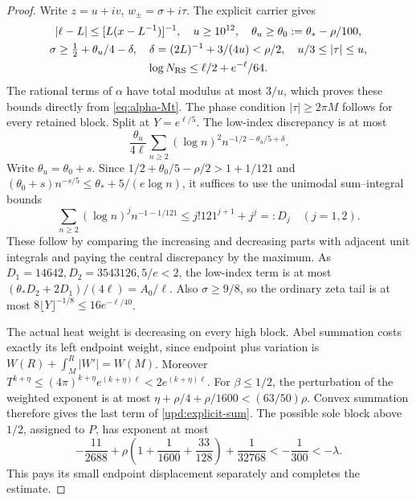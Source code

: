 \documentclass[11pt]{article}
\numberwithin{equation}{section}
\theoremstyle{definition}
\theoremstyle{remark}
\begin{document}
\begin{proof}
Write $z=u+iv$, $w_\pm=\sigma+i\tau$. The explicit carrier gives
\begin{gather*}
 |\ell-L|\le[L(x-L^{-1})]^{-1},\quad u\ge10^{12},
 \quad\theta_u\ge\theta_0:=\theta_*-\rho/100,\\
 \sigma\ge\tfrac12+\theta_u/4-\delta,
 \quad\delta=(2L)^{-1}+3/(4u)<\rho/2,\quad
 u/3\le|\tau|\le u,\\
 \log N_{\rm RS}\le\ell/2+e^{-\ell}/64.
\end{gather*}
The rational terms of $\alpha$ have total modulus at most $3/u$,
which proves these bounds directly from \eqref{eq:alpha-Mt}.
The phase condition $|\tau|\ge2\pi M$ follows for every retained
block. Split at $Y=e^{\ell/5}$. The low-index discrepancy is at most
\[
 \frac{\theta_u}{4\ell}\sum_{n\ge2}(\log n)^2
                             n^{-1/2-\theta_u/5+\delta}.
\]
Write $\theta_u=\theta_0+s$. Since
$1/2+\theta_0/5-\rho/2>1+1/121$ and
$(\theta_0+s)n^{-s/5}\le\theta_*+5/(e\log n)$, it suffices to use
the unimodal sum--integral bounds
\[
 \sum_{n\ge2}(\log n)^j n^{-1-1/121}
      \le j!121^{j+1}+j^j=:D_j\quad(j=1,2).
\]
These follow by comparing the increasing and decreasing parts with
adjacent unit integrals and paying the central discrepancy by the
maximum.  As $D_1=14642,D_2=3543126,5/e<2$, the low-index term is
at most $(\theta_*D_2+2D_1)/(4\ell)=A_0/\ell$.  Also
$\sigma\ge9/8$, so the ordinary zeta tail is at most
$8\lfloor Y\rfloor^{-1/8}\le16e^{-\ell/40}$.

The actual heat weight is decreasing on every high block. Abel
summation costs exactly its left endpoint weight, since endpoint plus
variation is $W(R)+\int_M^R|W'|=W(M)$.  Moreover
$T^{k+\eta}\le(4\pi)^{k+\eta}e^{(k+\eta)\ell}
<2e^{(k+\eta)\ell}$. For $\beta\le1/2$, the perturbation of the
weighted exponent is at most
$\eta+\rho/4+\rho/1600<(63/50)\rho$.
Convex summation therefore gives the last term of
\eqref{upd:explicit-sum}.  The possible sole block above $1/2$,
assigned to $P$, has exponent at most
\[
 -\frac{11}{2688}+\rho\left(1+\frac1{1600}+\frac{33}{128}\right)
                 +\frac1{32768}<-\frac1{300}<-\lambda.
\]
This pays its small endpoint displacement separately and completes
the estimate.
\end{proof}
\end{document}
